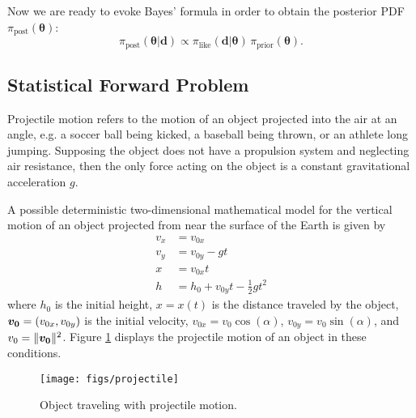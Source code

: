 Now we are ready to evoke Bayes' formula in order to obtain the posterior PDF $\pi_{\text{post}}(\boldsymbol{\theta})$:
\begin{equation}\label{eq-Bayes-g}
\pi_{\text{post}}(\boldsymbol{\theta}|\mathbf{d})\varpropto  \pi_{\text{like}}(\mathbf{d}|\boldsymbol{\theta}) \, \pi_{\text{prior}}(\boldsymbol{\theta}).
\end{equation}


\subsection{Statistical Forward Problem}


Projectile motion refers to the motion of an object projected into the air at an angle, e.g. a soccer ball being kicked, a baseball being thrown, or an athlete long jumping. Supposing the object does not have a propulsion system and neglecting air resistance, then the only force acting on the object is a constant gravitational acceleration $g$.


A possible deterministic two-dimensional mathematical model for the vertical motion of an object projected from near the surface of the Earth is given by
\begin{align}\label{eq:fwd01}
v_x &= v_{0x} \\ %
v_y &= v_{0y} - gt \\ %
  x &= v_{0x}t \\ %
  h &= h_0 + v_{0y}t - \frac{1}{2} g t^2  %
\end{align}
where
$h_0$ is the initial height, $x=x(t)$ is the distance traveled by the object, $\mbox{\boldmath$ v_0 $}=(v_{0x},v_{0y})$ is the initial velocity,
$v_{0x} = v_{0} \cos(\alpha)$, $v_{0y} = v_{0} \sin(\alpha)$, and $v_0=\|\mbox{\boldmath$ v_0 $}\|^2$.
%
Figure \ref{fig:projectile} displays the projectile motion of an object in these conditions.
\begin{figure}[!h]
\centering
\texttt{[image: figs/projectile]}
\vspace*{-8pt}
\caption{Object traveling with projectile motion. }
\label{fig:projectile}
\end{figure}




